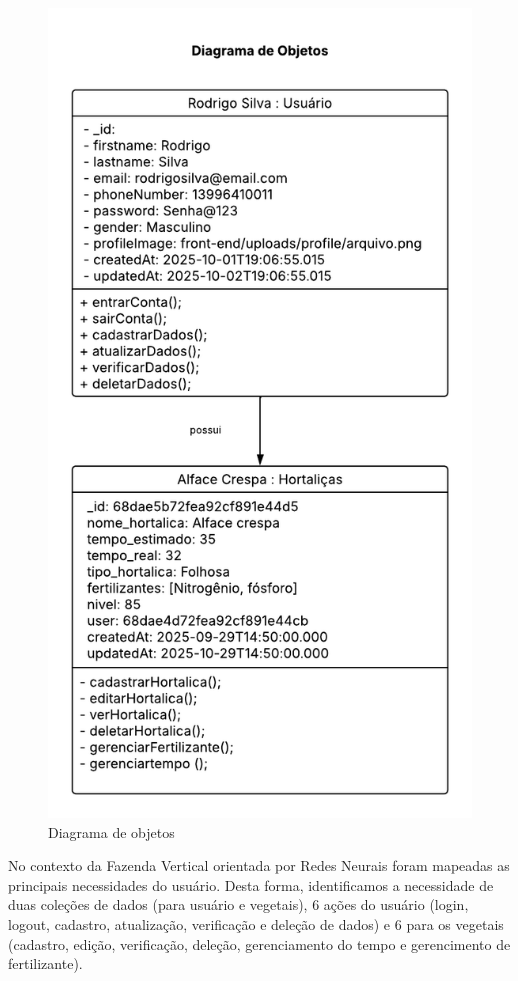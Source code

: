 \documentclass[
  a4paper,
  12pt,
  english,
  brazilian,
]{article}
\begin{document}
\begin{figure}[H] %
\centering
\caption{Diagrama de objetos}
\includegraphics[scale=0.5]{Logos/PI - Diagrama de Objetos.png}
\end{figure}

    No contexto da Fazenda Vertical orientada por Redes Neurais foram mapeadas as principais necessidades do usuário. Desta forma, identificamos a necessidade de duas coleções de dados (para usuário e vegetais), 6 ações do usuário (login, logout, cadastro, atualização, verificação e deleção de dados) e 6 para os vegetais (cadastro, edição, verificação, deleção, gerenciamento do tempo e gerencimento de fertilizante).
    
\end{document}
